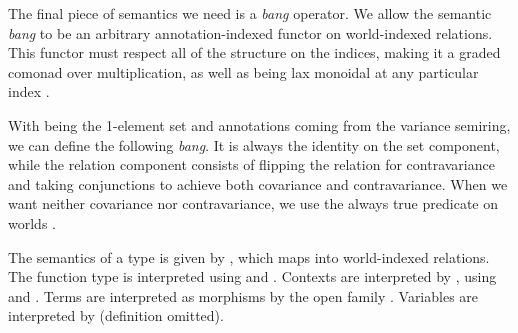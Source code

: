 The final piece of semantics we need is a \emph{bang} operator.
We allow the
semantic \emph{bang} to be an arbitrary annotation-indexed functor on
world-indexed relations.
This functor must respect all of the structure on the indices, making it a
graded comonad over multiplication, as well as being lax monoidal at any
particular index .


\begin{example}
  With  being the 1-element set and annotations coming from the
  variance semiring, we can define the following \emph{bang}.
  It is always the identity on the set component, while the relation component
  consists of flipping the relation for contravariance and taking conjunctions
  to achieve both covariance and contravariance.
  When we want neither covariance nor contravariance, we use the always true
  predicate on worlds .

\end{example}

%
%
%

The semantics of a type is given by \AgdaFunction{$\llbracket$\_$\rrbracket$},
which maps into world-indexed relations.
The function type is interpreted using  and
.
Contexts are interpreted by , using
 and .
Terms are interpreted as morphisms by the open family
\AgdaFunction{$\llbracket$\_$\vdash$\_$\rrbracket$}.
Variables are interpreted by  (definition omitted).


